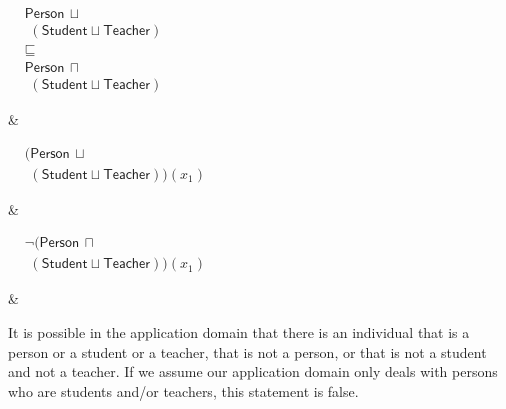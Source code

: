 \documentclass{amsart}
\newcommand\tableEntailmentSpacing{2.5cm}
\newcommand\tableExamplarSpacing{3.5cm}
\newcommand\tableCommentSpacing{4cm}
\newcommand\tableEquationIndent{4pt}
\begin{document}
\begin{table}
\begin{center}
\begin{tabular}
        \hline
        \begin{minipage}{\tableEntailmentSpacing}
            $\begin{aligned}
              &\mathsf{Person} \hspace{2pt} \sqcup \\
              &\hspace{\tableEquationIndent}(\mathsf{Student} \sqcup \mathsf{Teacher})\\ 
  	      &\sqsubseteq\\
  	      &\mathsf{Person} \hspace{2pt} \sqcap \\
  	      &\hspace{\tableEquationIndent}(\mathsf{Student} \sqcup \mathsf{Teacher})
           \end{aligned}$
  	\end{minipage}
        &
        \begin{minipage}{\tableExamplarSpacing}
  	    $\begin{aligned}
               &(\mathsf{Person} \hspace{2pt} \sqcup \\
               &\hspace{\tableEquationIndent}(\mathsf{Student} \sqcup \mathsf{Teacher}))(x_1)
  	    \end{aligned}$
  	\end{minipage}
  	&
  	\begin{minipage}{\tableExamplarSpacing}
  	    \vspace{2pt}
  	   $\begin{aligned}
             &\neg(\mathsf{Person} \hspace{2pt} \sqcap \\
             &\hspace{\tableEquationIndent}(\mathsf{Student} \sqcup \mathsf{Teacher}))(x_1)
  	    \end{aligned}$ 
  	\end{minipage}
        &
        \begin{minipage}{\tableCommentSpacing}
            \vspace{2pt}
            It is possible in the application domain that there is an individual that is a person or a student or a teacher, that is not a person, or that is not a student and not a teacher. If we assume our application domain only deals with persons who are students and/or teachers, this statement is false.
            \vspace{2pt}
        \end{minipage}     
        \\
         \hline      
       \end{tabular}
     \end{center}
     \normalsize
   \end{table}
  
\end{document}
